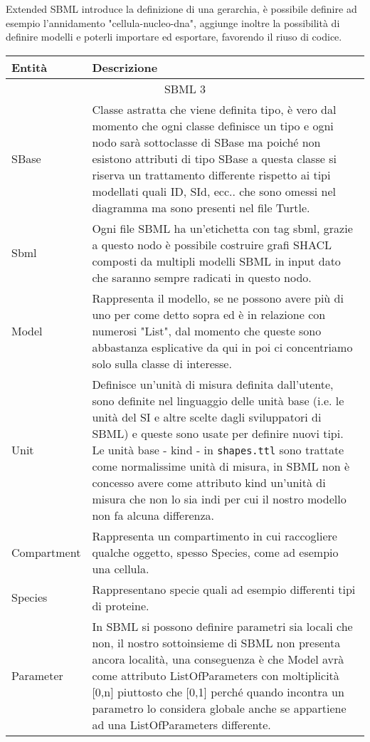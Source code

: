 \documentclass{article}
\begin{document}
Extended SBML introduce la definizione di una gerarchia, è possibile definire ad esempio l'annidamento "cellula-nucleo-dna", aggiunge inoltre la possibilità di definire modelli e poterli importare ed esportare, favorendo il riuso di codice.

\begin{longtable}{p{}p{}}
    \textbf{Entità} & \textbf{Descrizione} \\
    \hline
    \multicolumn{2}{c}{SBML 3} \\
    \hline
    SBase & Classe astratta che viene definita tipo, è vero dal momento che ogni classe definisce un tipo e ogni nodo sarà sottoclasse di SBase ma poiché non esistono attributi di tipo SBase a questa classe si riserva un trattamento differente rispetto ai tipi modellati quali ID, SId, ecc.. che sono omessi nel diagramma ma sono presenti nel file Turtle. \\ 
    \hline
    Sbml & Ogni file SBML ha un'etichetta con tag sbml, grazie a questo nodo è possibile costruire grafi SHACL composti da multipli modelli SBML in input dato che saranno sempre radicati in questo nodo. \\
    \hline
    Model & Rappresenta il modello, se ne possono avere più di uno per come detto sopra ed è in relazione con numerosi "List", dal momento che queste sono abbastanza esplicative da qui in poi ci concentriamo solo sulla classe di interesse. \\
    \hline
    Unit & Definisce un'unità di misura definita dall'utente, sono definite nel linguaggio delle unità base (i.e. le unità del SI e altre scelte dagli sviluppatori di SBML) e queste sono usate per definire nuovi tipi. Le unità base - kind - in \texttt{shapes.ttl} sono trattate come normalissime unità di misura, in SBML non è concesso avere come attributo kind un'unità di misura che non lo sia indi per cui il nostro modello non fa alcuna differenza. \\
    \hline 
    Compartment & Rappresenta un compartimento in cui raccogliere qualche oggetto, spesso Species, come ad esempio una cellula. \\
    \hline
    Species & Rappresentano specie quali ad esempio differenti tipi di proteine. \\
    \hline
    Parameter & In SBML si possono definire parametri sia locali che non, il nostro sottoinsieme di SBML non presenta ancora località, una conseguenza è che Model avrà come attributo ListOfParameters con moltiplicità [0,n] piuttosto che [0,1] perché quando incontra un parametro lo considera globale anche se appartiene ad una ListOfParameters differente. \\  

\end{longtable}
\end{document}
